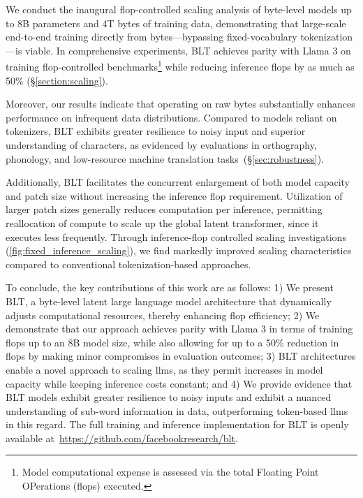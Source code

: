 We conduct the inaugural flop-controlled scaling analysis of byte-level models up to 8B parameters and 4T bytes of training data, demonstrating that large-scale end-to-end training directly from bytes—bypassing fixed-vocabulary tokenization—is viable. In comprehensive experiments, {\textsc BLT} achieves parity with Llama 3 on training flop-controlled benchmarks\footnote{Model computational expense is assessed via the total Floating Point OPerations (flops) executed.} while reducing inference flops by as much as 50\% (\S\ref{section:scaling}). 

Moreover, our results indicate that operating on raw bytes substantially enhances performance on infrequent data distributions. Compared to models reliant on tokenizers, {\textsc BLT} exhibits greater resilience to noisy input and superior understanding of characters, as evidenced by evaluations in orthography, phonology, and low-resource machine translation tasks~(\S\ref{sec:robustness}).

Additionally, {\textsc BLT} facilitates the concurrent enlargement of both model capacity and patch size without increasing the inference flop requirement. Utilization of larger patch sizes generally reduces computation per inference, permitting reallocation of compute to scale up the global latent transformer, since it executes less frequently. Through inference-flop controlled scaling investigations (\autoref{fig:fixed_inference_scaling}), we find markedly improved scaling characteristics compared to conventional tokenization-based approaches.

To conclude, the key contributions of this work are as follows: 1) We present {\textsc BLT}, a byte-level latent large language model architecture that dynamically adjusts computational resources, thereby enhancing flop efficiency; 2) We demonstrate that our approach achieves parity with Llama 3 in terms of training flops up to an 8B model size, while also allowing for up to a 50\% reduction in flops by making minor compromises in evaluation outcomes; 3) {\textsc BLT} architectures enable a novel approach to scaling llms, as they permit increases in model capacity while keeping inference costs constant; and 4) We provide evidence that {\textsc BLT} models exhibit greater resilience to noisy inputs and exhibit a nuanced understanding of sub-word information in data, outperforming token-based llms in this regard. The full training and inference implementation for {\textsc BLT} is openly available at~\url{https://github.com/facebookresearch/blt}.

